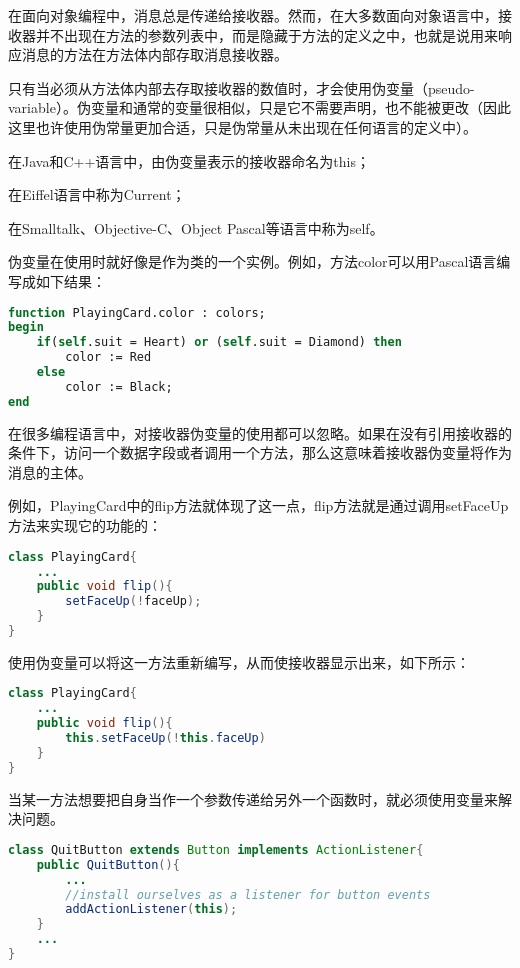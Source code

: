 在面向对象编程中，消息总是传递给接收器。然而，在大多数面向对象语言中，接收器并不出现在方法的参数列表中，而是隐藏于方法的定义之中，也就是说用来响应消息的方法在方法体内部存取消息接收器。

只有当必须从方法体内部去存取接收器的数值时，才会使用伪变量（pseudo-variable）。伪变量和通常的变量很相似，只是它不需要声明，也不能被更改（因此这里也许使用伪常量更加合适，只是伪常量从未出现在任何语言的定义中）。

\begin{compactitem}
\item 在Java和C++语言中，由伪变量表示的接收器命名为this；
\item 在Eiffel语言中称为Current；
\item 在Smalltalk、Objective-C、Object Pascal等语言中称为self。
\end{compactitem}

伪变量在使用时就好像是作为类的一个实例。例如，方法color可以用Pascal语言编写成如下结果：

\begin{lstlisting}[language=Pascal]
function PlayingCard.color : colors;
begin
	if(self.suit = Heart) or (self.suit = Diamond) then
		color := Red
	else
		color := Black;
end
\end{lstlisting}

在很多编程语言中，对接收器伪变量的使用都可以忽略。如果在没有引用接收器的条件下，访问一个数据字段或者调用一个方法，那么这意味着接收器伪变量将作为消息的主体。

例如，PlayingCard中的flip方法就体现了这一点，flip方法就是通过调用setFaceUp方法来实现它的功能的：



\begin{lstlisting}[language=Java]
class PlayingCard{
	...
	public void flip(){
		setFaceUp(!faceUp);
	}
}
\end{lstlisting}

使用伪变量可以将这一方法重新编写，从而使接收器显示出来，如下所示：



\begin{lstlisting}[language=Java]
class PlayingCard{
	...
	public void flip(){
		this.setFaceUp(!this.faceUp)
	}
}
\end{lstlisting}

当某一方法想要把自身当作一个参数传递给另外一个函数时，就必须使用变量来解决问题。



\begin{lstlisting}[language=Java]
class QuitButton extends Button implements ActionListener{
	public QuitButton(){
		...
		//install ourselves as a listener for button events
		addActionListener(this);
	}
	...
}
\end{lstlisting}

